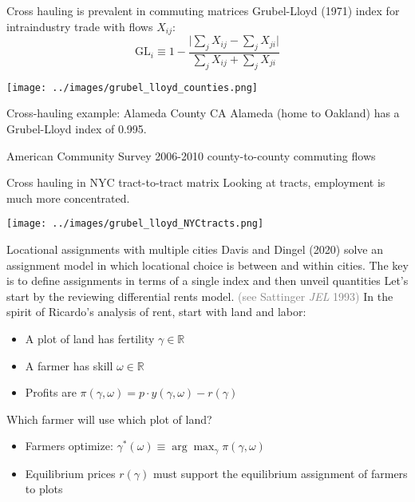 \documentclass[11pt,notes=hide,aspectratio=169]{beamer}
\begin{document}
\begin{frame}{Cross hauling is prevalent in commuting matrices}
Grubel-Lloyd (1971) index for intraindustry trade with flows $X_{ij}$:
$$
\textrm{GL}_{i}
\equiv
1 - \frac{\vert \sum_{j} X_{ij} - \sum_{j} X_{ji} \vert}{\sum_{j} X_{ij} + \sum_{j} X_{ji}}
$$
\vspace{-3mm}
\begin{center}
\texttt{[image: ../images/grubel\_lloyd\_counties.png]}
\end{center}
\end{frame}
\begin{frame}{Cross-hauling example: Alameda County CA}
Alameda (home to Oakland) has a Grubel-Lloyd index of 0.995.
\begin{center}
\resizebox{0.7\textwidth}{!}{

}
\end{center}
American Community Survey 2006-2010 county-to-county commuting flows
\end{frame}
\begin{frame}{Cross hauling in NYC tract-to-tract matrix}
Looking at tracts, employment is much more concentrated.
\begin{center}
\texttt{[image: ../images/grubel\_lloyd\_NYCtracts.png]}
\end{center}
\end{frame}
\begin{frame}{Locational assignments with multiple cities}
Davis and Dingel (2020) solve an assignment model in which locational choice is between and within cities.
The key is to define assignments in terms of a single index and then unveil quantities
\medskip
Let's start by the reviewing differential rents model.
\textcolor{gray}{(see Sattinger \textit{JEL} 1993)}
In the spirit of Ricardo's analysis of rent, start with land and labor:
\begin{itemize}
	\item A plot of land has fertility $\gamma \in\mathbb{R}$
	\item A farmer has skill $\omega \in\mathbb{R}$
	\item Profits are $\pi(\gamma,\omega) = p\cdot y(\gamma,\omega) - r(\gamma)$
\end{itemize}
Which farmer will use which plot of land?
\begin{itemize}
	\item Farmers optimize: $\gamma^{*}(\omega) \equiv \arg\max_{\gamma} \pi(\gamma,\omega)$
	\item Equilibrium prices $r(\gamma)$ must support the equilibrium assignment of farmers to plots
\end{itemize}
\end{frame}
\end{document}
